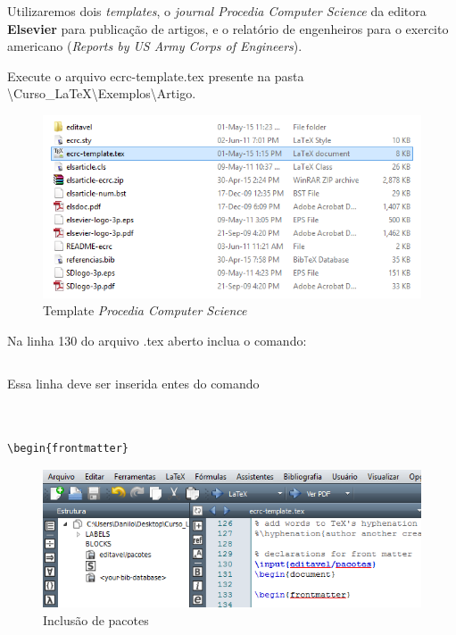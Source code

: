 \begin{frame}
Utilizaremos dois {\it templates}, o {\it journal Procedia Computer Science} da editora \textbf{Elsevier} para publicação de artigos, e o relatório de engenheiros para o exercito americano ({\it Re­ports by US Army Corps of Engi­neers}).

Execute o arquivo {\ttfamily ecrc-template.tex} presente na pasta {\ttfamily\textbackslash Curso\_LaTeX\textbackslash Exemplos\textbackslash Artigo}.
\begin{figure}
\begin{center}
\includegraphics[scale=0.5]{figuras/figelsiever}
\caption{Template \textit{Procedia Computer Science}}
\end{center}
\end{figure}
\end{frame}

\begin{frame}[fragile]
Na linha 130 do arquivo .tex aberto inclua o comando:
\begin{verbatim}

\end{verbatim}

Essa linha deve ser inserida entes do comando

\begin{verbatim}


\begin{frontmatter}
\end{verbatim}

\begin{figure}
\begin{center}
\includegraphics[scale=0.5]{figuras/fig2}
\caption{Inclusão de pacotes}
\end{center}
\end{figure}
\end{frame}



